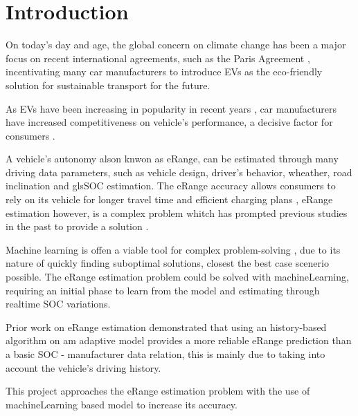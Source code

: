 \chapter{Introduction}
\label{cha:introduction}

On today's day and age, the global concern on climate
change has been a major focus on recent international agreements,
such as the Paris Agreement \cite{parisAgreement},
incentivating many car manufacturers to introduce
\gls{EVs} as the eco-friendly
solution for sustainable transport for the future.


As \gls{EVs} have been increasing in popularity in
recent years , car manufacturers have
increased competitiveness on vehicle's performance,
a decisive factor for consumers \cite{EGBUE2012717}.


A vehicle's autonomy alson knwon as \gls{eRange},
can be estimated through many driving data parameters,
such as vehicle design, driver's behavior, wheather,
road inclination and gls{SOC} estimation.
The \gls{eRange} accuracy allows consumers to rely
on its vehicle for longer travel time and efficient
charging plans , \gls{eRange} estimation
however, is a complex problem whitch has prompted
previous studies in the past to provide a solution 
\cite{classicEVX, predictionOfeRange}.

Machine learning is offen a viable tool for complex
problem-solving , due to its nature
of quickly finding suboptimal solutions,
closest the best case scenerio possible.
The \gls{eRange} estimation problem could be solved
with \gls{machineLearning}, requiring an initial
phase to learn from the model and estimating
through realtime \gls{SOC} variations.

Prior work \cite{classicEVX} on \gls{eRange}
estimation demonstrated that using an
history-based algorithm on am adaptive model
provides a more reliable \gls{eRange} prediction
than a basic \gls{SOC} - manufacturer data relation,
this is mainly due to taking into account the
vehicle's driving history.

This project approaches the \gls{eRange} estimation
problem with the use of \gls{machineLearning} based
model to increase its accuracy.

